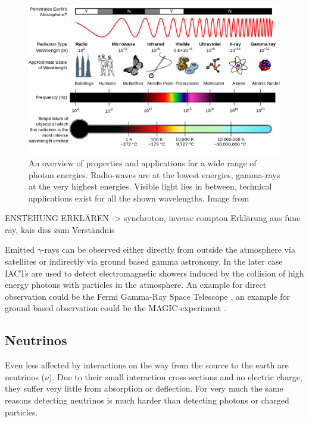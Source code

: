 \begin{figure}
	\centering
	\includegraphics[width=.8\textwidth]{images/em_spectrum.png}
	\caption{An overview of properties and applications for a wide 
		range of photon energies.
		Radio-waves are at the lowest energies, gamma-rays 
		at the very highest energies.
		Visible light lies in between, technical 
		applications exist for all the shown wavelengths.
		Image from \cite{wiki_em}}
	\label{fig:em_spectrum}
\end{figure}


ENSTEHUNG ERKLÄREN -> synchroton, inverse compton
Erklärung aus func ray, kais diss zum Verständnis




Emitted $\gamma$-rays can be observed either directly
from outside the atmosphere via satellites or indirectly
via ground based gamma astronomy. In the later case
IACTs are used to detect electromagnetic showers induced
by the collision of high energy photons with particles in the atmosphere.
An example for direct observation could be the Fermi 
Gamma-Ray Space Telescope \cite{Atwood_2009},
an example for ground based observation could be the
MAGIC-experiment \cite{LORENZ2004339}.

\iffalse
\subsection{Neutrinos}
Even less affected by interactions on the way 
from the source to the earth are neutrinos ($\nu$).
Due to their small interaction cross sections and no electric charge, they 
suffer very little from absorption or deflection.
For very much the same reasons detecting neutrinos is much harder
than detecting photons or charged particles.

